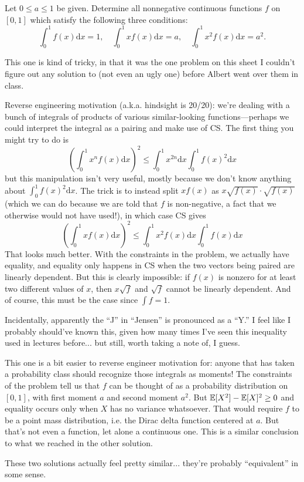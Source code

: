 \begin{problem}
	Let $0\leq a \leq 1$ be given. Determine all nonnegative continuous functions $f$ on $[0,1]$ which satisfy the following three conditions:
	\[
		\int_0^1 f(x) \mathrm{d}x = 1, \quad \int_0^1 xf(x) \mathrm{d}x = a, \quad \int_0^1 x^2 f(x) \mathrm{d}x = a^2.
	\]
\end{problem}
\begin{solution}
	This one is kind of tricky, in that it was the one problem on this sheet I couldn't figure out any solution to (not even an ugly one) before Albert went over them in class.
	
	Reverse engineering motivation (a.k.a. hindsight is 20/20): we're dealing with a bunch of integrals of products of various similar-looking functions---perhaps we could interpret the integral as a pairing and make use of CS. The first thing you might try to do is
	\[
		\left(\int_0^1 x^n f(x) \mathrm{d} x\right)^2 \leq \int_0^1 x^{2n} \mathrm{d} x \int_0^1 f(x)^2 \mathrm{d} x
	\]
	but this manipulation isn't very useful, mostly because we don't know anything about $\int_0^1 f(x)^2 \mathrm{d} x$.
	The trick is to instead split $xf(x)$ as $x\sqrt{f(x)} \cdot \sqrt{f(x)}$ (which we can do because we are told that $f$ is non-negative, a fact that we otherwise would not have used!), in which case CS gives
	\[
		\left(\int_0^1 x f(x) \mathrm{d}x \right)^2\leq \int_0^1 x^2 f(x)\mathrm{d}x \int_0^1 f(x) \mathrm{d}x
	\]
	That looks much better. With the constraints in the problem, we actually have equality, and equality only happens in CS when the two vectors being paired are linearly dependent. But this is clearly impossible: if $f(x)$ is nonzero for at least two different values of $x$, then $x\sqrt{f}$ and $\sqrt{f}$ cannot be linearly dependent. And of course, this must be the case since $\int f = 1$.
\end{solution}
\begin{solution}[2, Jensen's]
	Incidentally, apparently the ``J'' in ``Jensen'' is pronounced as a ``Y.'' I feel like I probably should've known this, given how many times I've seen this inequality used in lectures before... but still, worth taking a note of, I guess.
	
	This one is a bit easier to reverse engineer motivation for: anyone that has taken a probability class should recognize those integrals as moments! The constraints of the problem tell us that $f$ can be thought of as a probability distribution on $[0,1]$, with first moment $a$ and second moment $a^2$. But $\mathbb{E}[X^2] - \mathbb{E}[X]^2 \geq 0$ and equality occurs only when $X$ has no variance whatsoever. That would require $f$ to be a point mass distribution, i.e. the Dirac delta function centered at $a$. But that's not even a function, let alone a continuous one. This is a similar conclusion to what we reached in the other solution.
	
	These two solutions actually feel pretty similar... they're probably ``equivalent'' in some sense.
\end{solution}
